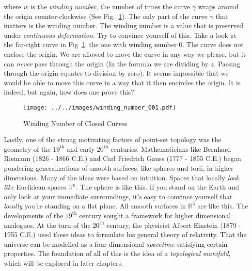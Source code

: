     where $w$ is the \textit{winding number}, the number of times the curve
    $\gamma$ wraps around the origin counter-clockwise
    (See Fig.~\ref{fig:winding_number_001}). The only part of the curve
    $\gamma$ that matters is the winding number. The winding number is a value
    that is preserved under \textit{continuous deformation}. Try to convince
    yourself of this. Take a look at the far-right curve in
    Fig~\ref{fig:winding_number_001}, the one with winding number 0. The curve
    does not enclose the origin. We are allowed to move the curve in any way
    we please, but it can \textit{never} pass through the origin
    (In the formula we are dividing by $z$. Passing through the origin equates
    to division by zero). It seems impossible that we would be able to move this
    curve in a way that it then encircles the origin. It is indeed, but again,
    how does one prove this?
    \begin{figure}
        \centering
        \texttt{[image: ../../images/winding\_number\_001.pdf]}
        \caption{Winding Number of Closed Curves}
        \label{fig:winding_number_001}
    \end{figure}
    \par\hfill\par
    Lastly, one of the strong motivating factors of point-set topology was
    the geometry of the $19^{\textrm{th}}$ and early
    $20^{\textrm{th}}$ centuries. Mathematicians like
    Bernhard Riemann (1826 - 1866 C.E.) and Carl Friedrich Gauss
    (1777 - 1855 C.E.) began pondering generalizations of smooth surfaces,
    like spheres and torii, in higher dimensions. Many of the ideas were based
    on intuition. Spaces that locally \textit{look like} Euclidean spaces
    $\mathbb{R}^{n}$. The sphere is like this. If you stand on the Earth and
    only look at your immediate surroundings, it's easy to convince yourself
    that \textit{locally} you're standing on a flat plane. All smooth surfaces
    in $\mathbb{R}^{3}$ are like this. The developments of the
    $19^{\textrm{th}}$ century sought a framework for higher dimensional
    analogues. At the turn of the $20^{\textrm{th}}$ century, the physicist
    Albert Einstein (1879 - 1955 C.E.) used these ideas to formulate his
    general theory of relativity. That the universe can be modelled as a
    four dimensional \textit{spacetime} satisfying certain properties. The
    foundation of all of this is the idea of a \textit{topological manifold},
    which will be explored in later chapters.
